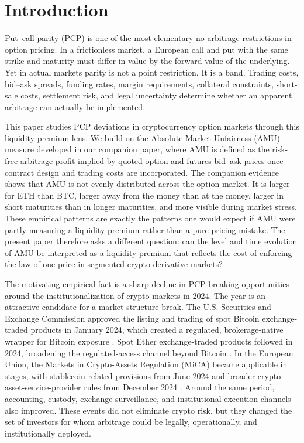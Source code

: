 \documentclass[12pt]{article}
\begin{document}
\section{Introduction}

Put--call parity (PCP) is one of the most elementary no-arbitrage restrictions in option pricing. In a frictionless market, a European call and put with the same strike and maturity must differ in value by the forward value of the underlying. Yet in actual markets parity is not a point restriction. It is a band. Trading costs, bid--ask spreads, funding rates, margin requirements, collateral constraints, short-sale costs, settlement risk, and legal uncertainty determine whether an apparent arbitrage can actually be implemented.

This paper studies PCP deviations in cryptocurrency option markets through this liquidity-premium lens. We build on the Absolute Market Unfairness (AMU) measure developed in our companion paper, where AMU is defined as the risk-free arbitrage profit implied by quoted option and futures bid--ask prices once contract design and trading costs are incorporated. The companion evidence shows that AMU is not evenly distributed across the option market. It is larger for ETH than BTC, larger away from the money than at the money, larger in short maturities than in longer maturities, and more visible during market stress. These empirical patterns are exactly the patterns one would expect if AMU were partly measuring a liquidity premium rather than a pure pricing mistake. The present paper therefore asks a different question: can the level and time evolution of AMU be interpreted as a liquidity premium that reflects the cost of enforcing the law of one price in segmented crypto derivative markets?

The motivating empirical fact is a sharp decline in PCP-breaking opportunities around the institutionalization of crypto markets in 2024. The year is an attractive candidate for a market-structure break. The U.S. Securities and Exchange Commission approved the listing and trading of spot Bitcoin exchange-traded products in January 2024, which created a regulated, brokerage-native wrapper for Bitcoin exposure \citep{sec_spot_bitcoin_etp_2024}. Spot Ether exchange-traded products followed in 2024, broadening the regulated-access channel beyond Bitcoin \citep{sec_spot_ether_etp_2024}. In the European Union, the Markets in Crypto-Assets Regulation (MiCA) became applicable in stages, with stablecoin-related provisions from June 2024 and broader crypto-asset-service-provider rules from December 2024 \citep{esma_mica_2024}. Around the same period, accounting, custody, exchange surveillance, and institutional execution channels also improved. These events did not eliminate crypto risk, but they changed the set of investors for whom arbitrage could be legally, operationally, and institutionally deployed.
\end{document}
